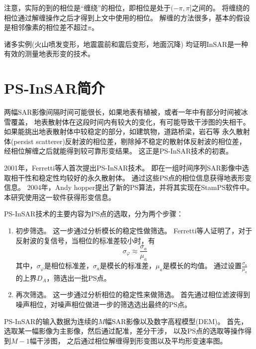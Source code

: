 注意，实际的到的相位是“缠绕”的相位，即相位是处于$(-\pi,\pi]$之间的。
将缠绕的相位通过解缠操作之后才得到上文中使用的相位。
解缠的方法很多，基本的假设是相邻像素的相位差不超过$\pi$。

诸多实例(火山喷发变形，地震震前和震后变形，地面沉降)
均证明InSAR是一种有效的测量地表形变的技术。

\section{PS-InSAR简介}
两幅SAR影像间隔时间可能很长，如果地表有植被，或者一年中有部分时间被冰雪覆盖，
地表散射体在这段时间内有较大的变化，有可能导致干涉图的失相干。
如果能挑出地表散射体中较稳定的部分，如建筑物，道路桥梁，岩石等
永久散射体(persist scatterer)反射波的相位差，剔除掉不稳定的散射体反射波的相位差，
经相位解缠之后就能得到较可靠形变结果。
这正是PS-InSAR技术的初衷。

2001年，Ferretti等人首次提出PS-InSAR技术。
即在一组时间序列SAR影像中选取相干性和稳定性均较好的永久散射体。
通过这些PS点的相位信息获得地表形变信息。
2004年，Andy hopper提出了新的PS算法，并将其实现在StamPS软件中。
本研究使用这一软件获得形变信息。

PS-InSAR技术的主要内容为PS点的选取，分为两个步骤：
\begin{enumerate}
    \item 初步筛选。
    这一步通过分析模长的稳定性做筛选。
    Ferretti等人证明了，对于反射波的复信号，当相位的标准差较小时，有
    \begin{equation}
        \sigma_\varphi \approx \frac{\sigma_a}{\mu_a}
    \end{equation}
    其中，$\sigma_\varphi$是相位标准差，$\sigma_a$是模长的标准差，$\mu_a$是模长的均值。
    通过设置$\frac{\sigma_a}{\mu_a}$的上界$D_A$，筛选出一批PS点。
    \item 再次筛选。
    这一步通过分析相位的稳定性来做筛选。
    首先通过相位滤波得到噪声相位，对噪声相位做进一步的筛选选出最终的PS点。
\end{enumerate}

PS-InSAR的输入数据为连续的$M$幅SAR影像以及数字高程模型(DEM)。
首先，选取某一幅影像为主影像，然后通过配准，差分干涉，
以及PS点的选取等操作得到$M-1$幅干涉图，
之后通过相位解缠得到形变图以及平均形变速率图。

